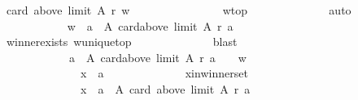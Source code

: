 \begin{isabellebody}
\ {\isachardoublequoteopen}card\ {\isacharparenleft}{\kern0pt}above\ {\isacharparenleft}{\kern0pt}limit\ A\ r{\isacharparenright}{\kern0pt}\ w{\isacharparenright}{\kern0pt}\ {\isasymle}\ {}{\isachardoublequoteclose}\isanewline
\ \ \ \ \ \ \ \ \ \ \ \ \isamarkupfalse%
\ w{\isacharunderscore}{\kern0pt}top\isanewline
\ \ \ \ \ \ \ \ \ \ \ \ \isamarkupfalse%
\ auto\isanewline
\ \ \ \ \ \ \ \ \ \ \isamarkupfalse%
\ {\isachardoublequoteopen}{\isacharbraceleft}{\kern0pt}w{\isacharbraceright}{\kern0pt}\ {\isasymsubseteq}\ {\isacharbraceleft}{\kern0pt}a\ {\isasymin}\ A{\isachardot}{\kern0pt}\ card{\isacharparenleft}{\kern0pt}above\ {\isacharparenleft}{\kern0pt}limit\ A\ r{\isacharparenright}{\kern0pt}\ a{\isacharparenright}{\kern0pt}\ {\isasymle}\ {}{\isacharbraceright}{\kern0pt}{\isachardoublequoteclose}\isanewline
\ \ \ \ \ \ \ \ \ \ \ \ \isamarkupfalse%
\ winner{\isacharunderscore}{\kern0pt}exists\ w{\isacharunderscore}{\kern0pt}unique{\isacharunderscore}{\kern0pt}top\isanewline
\ \ \ \ \ \ \ \ \ \ \ \ \isamarkupfalse%
\ blast\isanewline
\ \ \ \ \ \ \ \ \ \ \isamarkupfalse%
\ \isamarkupfalse%
\isanewline
\ \ \ \ \ \ \ \ \ \ \ \ {\isachardoublequoteopen}{\isacharbraceleft}{\kern0pt}a\ {\isasymin}\ A{\isachardot}{\kern0pt}\ card{\isacharparenleft}{\kern0pt}above\ {\isacharparenleft}{\kern0pt}limit\ A\ r{\isacharparenright}{\kern0pt}\ a{\isacharparenright}{\kern0pt}\ {\isasymle}\ {}{\isacharbraceright}{\kern0pt}\ {\isasymsubseteq}\ {\isacharbraceleft}{\kern0pt}w{\isacharbraceright}{\kern0pt}{\isachardoublequoteclose}\isanewline
\ \ \ \ \ \ \ \ \ \ \isamarkupfalse%
\isanewline
\ \ \ \ \ \ \ \ \ \ \ \ \isamarkupfalse%
\isanewline
\ \ \ \ \ \ \ \ \ \ \ \ \ \ x\ {\isacharcolon}{\kern0pt}{\isacharcolon}{\kern0pt}\ {\isachardoublequoteopen}{\isacharprime}{\kern0pt}a{\isachardoublequoteclose}\isanewline
\ \ \ \ \ \ \ \ \ \ \ \ \isamarkupfalse%
\ x{\isacharunderscore}{\kern0pt}in{\isacharunderscore}{\kern0pt}winner{\isacharunderscore}{\kern0pt}set{\isacharcolon}{\kern0pt}\isanewline
\ \ \ \ \ \ \ \ \ \ \ \ \ \ {\isachardoublequoteopen}x\ {\isasymin}\ {\isacharbraceleft}{\kern0pt}a\ {\isasymin}\ A{\isachardot}{\kern0pt}\ card\ {\isacharparenleft}{\kern0pt}above\ {\isacharparenleft}{\kern0pt}limit\ A\ r{\isacharparenright}{\kern0pt}\ a{\isacharparenright}{\kern0pt}\ {\isasymle}\ {}{\isacharbraceright}{\kern0pt}{\isachardoublequoteclose}\isanewline
\ \ \ \ \ \ \ \ \ \ \ \ \isamarkupfalse%

\end{isabellebody}
